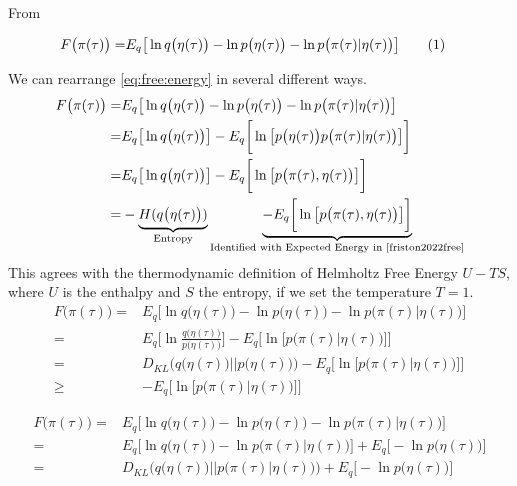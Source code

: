 \documentclass[]{article}
\newcommand\numberthis{\addtocounter{equation}{1}\tag{\theequation}}
\begin{document}
From \cite{friston2022free}

\begin{align*}
	F\big(\pi(\tau)\big) =& E_q\big[\ln q\big(\eta(\tau)\big) - \ln p\big(\eta(\tau)\big) - \ln p\big(\pi(\tau)\vert\eta(\tau)\big)\big] \numberthis \label{eq:free:energy}
\end{align*}

We can rearrange \eqref{eq:free:energy} in several different ways.
\begin{align*}
	F\big(\pi(\tau)\big) =& E_q\big[\ln q\big(\eta(\tau)\big) - \ln p\big(\eta(\tau)\big) - \ln p\big(\pi(\tau)\vert\eta(\tau)\big)\big]\\
	=& E_q\big[\ln q\big(\eta(\tau)\big)\big] - E_q \bigg[\ln \big[p\big(\eta(\tau)\big)  p\big(\pi(\tau)\vert\eta(\tau)\big)\big]\bigg]\\
	=& E_q\big[\ln q\big(\eta(\tau)\big)\big] - E_q \bigg[\ln \big[  p\big(\pi(\tau),\eta(\tau)\big)\big]\bigg]\\
	=&-\underbrace{H(q\big(\eta(\tau)\big))}_\text{Entropy}  \underbrace{- E_q \bigg[\ln \big[  p\big(\pi(\tau),\eta(\tau)\big)\big]\bigg]}_\text{Identified with Expected Energy in \cite{friston2022free}}
\end{align*}
This agrees with the thermodynamic definition of Helmholtz Free Energy $U-TS$, where $U$ is the enthalpy and $S$ the entropy, if we set the temperature $T=1$.
\begin{align*}
	F\big(\pi(\tau)\big) =& E_q\big[\ln q\big(\eta(\tau)\big) - \ln p\big(\eta(\tau)\big) - \ln p\big(\pi(\tau)\vert\eta(\tau)\big)\big]\\
	=& E_q\big[\ln \frac{q\big(\eta(\tau)\big)}{p\big(\eta(\tau)\big)}   \big] - E_q \bigg[\ln \big[  p\big(\pi(\tau)\vert\eta(\tau)\big)\big]\bigg]\\
	=& D_{KL}\big(q\big(\eta(\tau)\big)\vert\vert p\big(\eta(\tau)\big)\big)- E_q \bigg[\ln \big[  p\big(\pi(\tau)\vert\eta(\tau)\big)\big]\bigg]\\
	\ge&- E_q \bigg[\ln \big[  p\big(\pi(\tau)\vert\eta(\tau)\big)\big]\bigg]
\end{align*}

\begin{align*}
	F\big(\pi(\tau)\big) =& E_q\big[\ln q\big(\eta(\tau)\big) - \ln p\big(\eta(\tau)\big) - \ln p\big(\pi(\tau)\vert\eta(\tau)\big)\big]\\
	=& E_q\big[\ln q\big(\eta(\tau)\big)  - \ln p\big(\pi(\tau)\vert\eta(\tau)\big)\big] +  E_q\big[- \ln p\big(\eta(\tau)\big)\big]\\
	=& D_{KL}\big(q\big(\eta(\tau)\big)\vert\vert p\big(\pi(\tau)\vert\eta(\tau)\big)\big)+  E_q\big[- \ln p\big(\eta(\tau)\big)\big]
\end{align*}
\end{document}
